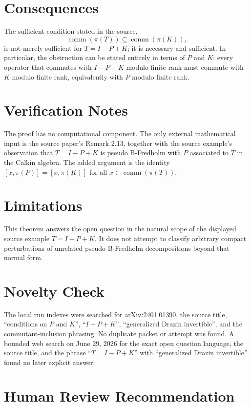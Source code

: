 \documentclass[11pt]{article}
\newcommand{\comm}{\operatorname{comm}}
\begin{document}
\section*{Consequences}

The sufficient condition stated in the source,
\[
  \comm(\pi(T))\subseteq \comm(\pi(K)),
\]
is not merely sufficient for \(T=I-P+K\); it is necessary and sufficient.  In
particular, the obstruction can be stated entirely in terms of \(P\) and \(K\):
every operator that commutes with \(I-P+K\) modulo finite rank must commute
with \(K\) modulo finite rank, equivalently with \(P\) modulo finite rank.

\section*{Verification Notes}

The proof has no computational component.  The only external mathematical
input is the source paper's Remark 2.13, together with the source example's
observation that \(T=I-P+K\) is pseudo B-Fredholm with \(P\) associated to
\(T\) in the Calkin algebra.  The added argument is the identity
\([x,\pi(P)]=[x,\pi(K)]\) for all \(x\in\comm(\pi(T))\).

\section*{Limitations}

This theorem answers the open question in the natural scope of the displayed
source example \(T=I-P+K\).  It does not attempt to classify arbitrary compact
perturbations of unrelated pseudo B-Fredholm decompositions beyond that
normal form.

\section*{Novelty Check}

The local run indexes were searched for arXiv:2401.01390, the source title,
``conditions on \(P\) and \(K\)'', ``\(I-P+K\)'', ``generalized Drazin
invertible'', and the commutant-inclusion phrasing.  No duplicate packet or
attempt was found.  A bounded web search on June 29, 2026 for the exact open
question language, the source title, and the phrase ``\(T=I-P+K\)'' with
``generalized Drazin invertible'' found no later explicit answer.

\section*{Human Review Recommendation}
\end{document}
